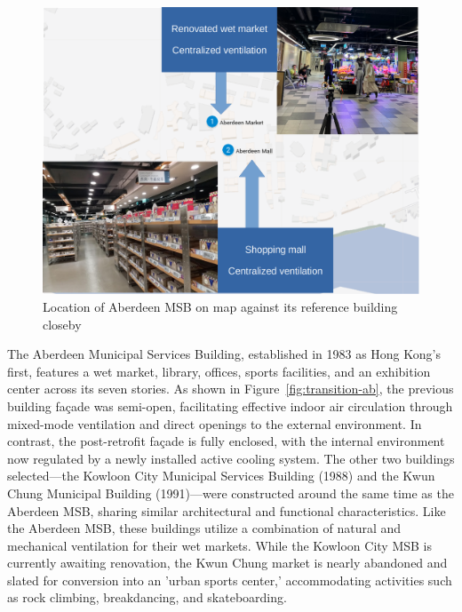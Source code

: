 \documentclass[preprint,12pt]{elsarticle}
\begin{document}
\begin{figure}[h]
    \centering
    \includegraphics[width=0.5\linewidth]{img/aberdeen_map.png}
    \caption{Location of Aberdeen MSB on map against its reference building closeby}
    \label{fig:ab-ref}
\end{figure}

The Aberdeen Municipal Services Building, established in 1983 as Hong Kong's first, features a wet market, library, offices, sports facilities, and an exhibition center across its seven stories. As shown in Figure~\ref{fig:transition-ab}, the previous building façade was semi-open, facilitating effective indoor air circulation through mixed-mode ventilation and direct openings to the external environment. In contrast, the post-retrofit façade is fully enclosed, with the internal environment now regulated by a newly installed active cooling system. The other two buildings selected—the Kowloon City Municipal Services Building (1988) and the Kwun Chung Municipal Building (1991)—were constructed around the same time as the Aberdeen MSB, sharing similar architectural and functional characteristics. Like the Aberdeen MSB, these buildings utilize a combination of natural and mechanical ventilation for their wet markets. While the Kowloon City MSB is currently awaiting renovation, the Kwun Chung market is nearly abandoned and slated for conversion into an 'urban sports center,' accommodating activities such as rock climbing, breakdancing, and skateboarding.
\end{document}

